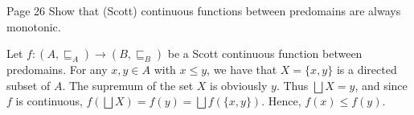 \begin{problem}{Page 26}
    Show that (Scott) continuous functions between predomains are always monotonic.
\end{problem}

\begin{solution}
    Let $ f:(A, \sqsubseteq_A) \to (B, \sqsubseteq_B) $ be a Scott continuous function between predomains. For any $x,y \in A$ with $ x \leq y $, we have that
    $ X = \{x,y\} $ is a directed subset of $A$. The supremum of the set $X$ is obviously $y$. Thus $\bigsqcup X = y$, and since $f$ is continuous, $f(\bigsqcup X) = f(y) = \bigsqcup f(\{x,y\})$.
    Hence, $f(x) \leq f(y)$.
\end{solution}
